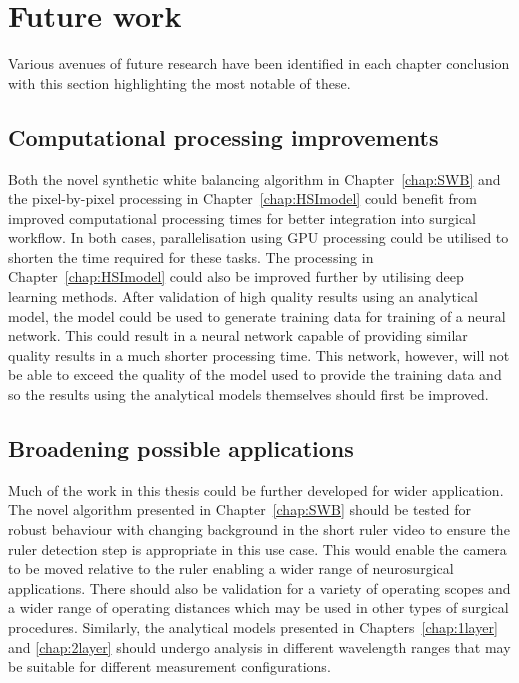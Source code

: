 \section{Future work}
Various avenues of future research have been identified in each chapter conclusion with this section highlighting the most notable of these. 

\subsection{Computational processing improvements}
Both the novel synthetic white balancing algorithm in Chapter~\ref{chap:SWB} and the pixel-by-pixel processing in Chapter~\ref{chap:HSImodel} could benefit from improved computational processing times for better integration into surgical workflow. In both cases, parallelisation using GPU processing could be utilised to shorten the time required for these tasks. The processing in Chapter~\ref{chap:HSImodel} could also be improved further by utilising deep learning methods. After validation of high quality results using an analytical model, the model could be used to generate training data for training of a neural network. This could result in a neural network capable of providing similar quality results in a much shorter processing time. This network, however, will not be able to exceed the quality of the model used to provide the training data and so the results using the analytical models themselves should first be improved. 

\subsection{Broadening possible applications}
Much of the work in this thesis could be further developed for wider application. The novel algorithm presented in Chapter~\ref{chap:SWB} should be tested for robust behaviour with changing background in the short ruler video to ensure the ruler detection step is appropriate in this use case. This would enable the camera to be moved relative to the ruler enabling a wider range of neurosurgical applications. There should also be validation for a variety of operating scopes and a wider range of operating distances which may be used in other types of surgical procedures. Similarly, the analytical models presented in Chapters~\ref{chap:1layer} and \ref{chap:2layer} should undergo analysis in different wavelength ranges that may be suitable for different measurement configurations. 

